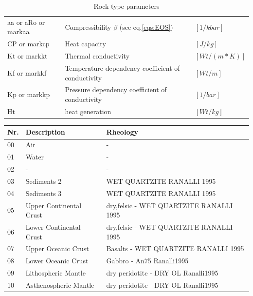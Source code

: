 \begin{table}[H]
\begin{tabular}{l p{8cm} l}
		aa or aRo or markaa & Compressibility $\beta$ (see eq.\ref{eqs:EOS}) & $[1/kbar]$\\ 
		CP or markcp & Heat capacity  & $[J/kg]$ \\ 
		Kt or markkt & Thermal conductivity & $[Wt/(m*K)]$ \\ 
		Kf or markkf & Temperature dependency coefficient of conductivity & $[Wt/m]$ \\ 
		Kp or markkp & Pressure dependency coefficient of conductivity & $[1/bar]$ \\ 
		Ht & heat generation & $[Wt/kg]$\\ 
		\bottomrule
	\end{tabular}
	\caption{Rock type parameters}
	\label{tbl:rock_type_parameters}
\end{table}


\begin{table}[H]
	\small
	\centering
	\begin{tabular}{l p{6cm} p{8cm}}
		\toprule
		Nr. & Description & Rheology\\
		\midrule
		\rowcolor[rgb]{1.0000    1.0000    1.0000}
		00 & Air & -\\
		\rowcolor[rgb]{0.5059    0.9961    0.7882}
		01 & Water & -\\
		\rowcolor[rgb]{1.0000    1.0000    1.0000}
		02 & - &  - \\
		\rowcolor[rgb]{0.6824    0.3412         0}
		03 & Sediments 2 & WET QUARTZITE RANALLI 1995 \\
		\rowcolor[rgb]{1.0000    0.5020         0}
		04 & Sediments 3 & WET QUARTZITE RANALLI 1995 \\
		\rowcolor[rgb]{0.7529    0.7529    0.7529}
		05 & Upper Continental Crust & dry,felsic - WET QUARTZITE RANALLI 1995 \\
		\rowcolor[rgb]{0.5020    0.5020    0.5020}
		06 & Lower Continental Crust & dry,felsic - WET QUARTZITE RANALLI 1995 \\
		\rowcolor[rgb]{ 0    0.5020         0}
		07 & Upper Oceanic Crust & Basalts - WET QUARTZITE RANALLI 1995 \\
		\rowcolor[rgb]{0    0.8431         0}
		08 & Lower Oceanic Crust & Gabbro - An75 Ranalli1995 \\
		\rowcolor[rgb]{0         0    0.7177}
		09 & Lithospheric Mantle & dry peridotite - DRY OL Ranalli1995 \\
		\rowcolor[rgb]{ 0.3216    0.2000    0.6745}
		10 & Asthenospheric Mantle & dry peridotite - DRY OL Ranalli1995 \\

\end{tabular}
\end{table}
